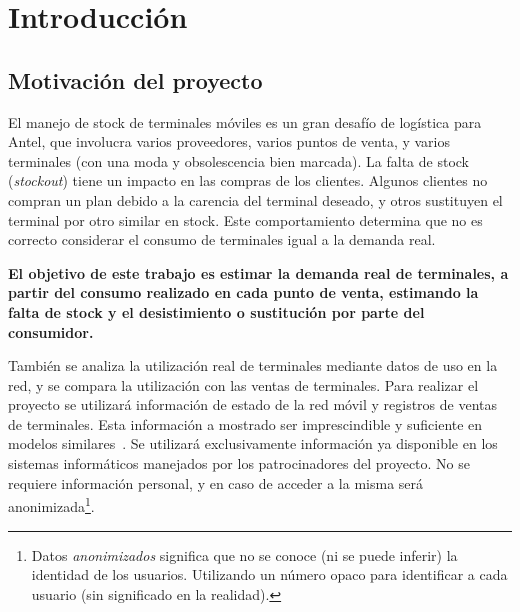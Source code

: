 
\chapter{Introducción}
\label{chap:intro}

\section{Motivación del proyecto}
\label{sec:resumen}

El manejo de stock de terminales móviles es un gran desafío de logística para Antel,
que involucra varios proveedores, varios puntos de venta, 
y varios terminales (con una moda y obsolescencia bien marcada).
La falta de stock (\textit{stockout}) tiene un impacto en las compras de los clientes. 
Algunos clientes no compran un plan debido a la carencia del terminal deseado, 
y otros sustituyen el terminal por otro similar en stock. Este comportamiento determina que
no es correcto considerar el consumo de terminales igual a la demanda real.

\begin{remark}\textbf{El objetivo de este trabajo es estimar la demanda real de terminales, 
a partir del consumo realizado en cada punto de venta, 
estimando la falta de stock y el desistimiento o sustitución por parte del consumidor.}\end{remark} 

También se analiza la utilización real de terminales mediante datos de uso en la red,
y se compara la utilización con las ventas de terminales.
Para realizar el proyecto se utilizará información de estado de la red móvil y registros
de ventas de terminales. Esta información a mostrado ser imprescindible y suficiente
en modelos similares~\cite{Karabati2009, Letham:2016}. Se utilizará exclusivamente información ya disponible en
los sistemas informáticos manejados por los patrocinadores del proyecto. 
No se requiere información personal, y en caso de acceder a la misma será anonimizada\footnote{Datos \emph{anonimizados} significa que no se conoce (ni se puede inferir) la identidad de los usuarios. Utilizando un número opaco para identificar a cada usuario (sin significado en la realidad).}.

